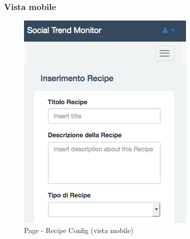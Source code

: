 		\subsubsection{Vista mobile} %
		\begin{figure}[htbp]
			\centering
			\centerline{\includegraphics[scale=0.5]{./images/mockup/recipe_config_vm.png}}
			\caption{Page - Recipe Config (vista mobile)}
		\end{figure}


